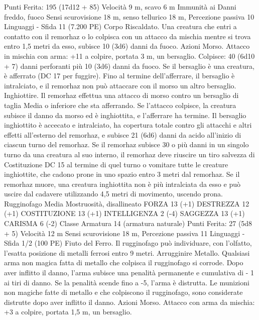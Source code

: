 \begin{multicols}{2}
\hspace*{0pt}\hfill{Punti Ferita}: 195 (17d12 + 85)
Velocità 9 m, scavo 6 m
Immunità ai Danni freddo, fuoco
Sensi scurovisione 18 m, senso tellurico 18 m, Percezione
passiva 10
Linguaggi -
Sfida 11 (7.200 PE)
Corpo Riscaldato. Una creatura che entri a contatto con il
remorhaz o lo colpisca con un attacco da mischia mentre si trova
entro 1,5 metri da esso, subisce 10 (3d6) danni da fuoco.
Azioni
Morso. Attacco in mischia con arma: +11 a colpire, portata 3 m,
un bersaglio.
Colpisce: 40 (6d10 + 7) danni perforanti più 10 (3d6) danni da
fuoco. Se il bersaglio è una creatura, è afferrato (DC 17 per
fuggire). Fino al termine dell’afferrare, il bersaglio è intralciato,
e il remorhaz non può attaccare con il morso un altro bersaglio.
Inghiottire. Il remorhaz effettua una attacco di morso contro un
bersaglio di taglia Media o inferiore che sta afferrando. Se
l’attacco colpisce, la creatura subisce il danno da morso ed è
inghiottita, e l’afferrare ha termine. Il bersaglio inghiottito è
accecato e intralciato, ha copertura totale contro gli attacchi e
altri effetti all’esterno del remorhaz, e subisce 21 (6d6) danni da
acido all’inizio di ciascun turno del remorhaz.
Se il remorhaz subisce 30 o più danni in un singolo turno da una
creatura al suo interno, il remorhaz deve riuscire un tiro salvezza
di Costituzione DC 15 al termine di quel turno o vomitare tutte le
creature inghiottite, che cadono prone in uno spazio entro 3 metri
dal remorhaz. Se il remorhaz muore, una creatura inghiottita non
è più intralciata da esso e può uscire dal cadavere utilizzando 4,5
metri di movimento, uscendo prona.
Rugginofago
Media Mostruosità, disallineato
FORZA 13 (+1)
DESTREZZA 12 (+1)
COSTITUZIONE 13 (+1)
INTELLIGENZA 2 (-4)
SAGGEZZA 13 (+1)
CARISMA 6 (-2)
Classe Armatura 14 (armatura naturale)
\hspace*{0pt}\hfill{Punti Ferita}: 27 (5d8 + 5)
Velocità 12 m
Sensi scurovisione 18 m, Percezione passiva 11
Linguaggi -
Sfida 1/2 (100 PE)
Fiuto del Ferro. Il rugginofago può individuare, con l’olfatto,
l’esatta posizione di metalli ferrosi entro 9 metri.
Arrugginire Metallo. Qualsiasi arma non magica fatta di metallo
che colpisca il rugginofago si corrode. Dopo aver inflitto il
danno, l’arma subisce una penalità permanente e cumulativa di -
1 ai tiri di danno. Se la penalità scende fino a -5, l’arma è
distrutta. Le munizioni non magiche fatte di metallo e che
colpiscono il rugginofago, sono considerate distrutte dopo aver
inflitto il danno.
Azioni
Morso. Attacco con arma da mischia: +3 a colpire, portata 1,5
m, un bersaglio.

\end{multicols}
